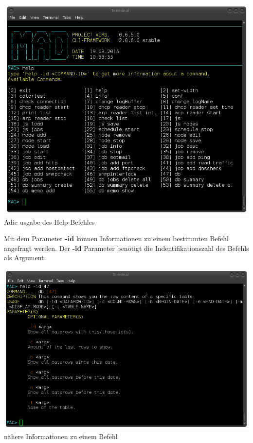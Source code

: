 \documentclass[12pt,a4paper]{report}
\begin{document}
\begin{onehalfspace}
\begin{center}
\includegraphics[scale=0.5]{img/cli_help.png}\\
Adie usgabe des Help-Befehles
\end{center}

Mit dem Parameter \textbf{-id} können Informationen zu einem bestimmten Befehl angefragt werden. Der \textbf{-id} Parameter benötigt die Indentifikationszahl des Befehls als Argument.

\begin{center}
\includegraphics[scale=0.5]{img/cli_help_id.png}\\
nähere Informationen zu einem Befehl
\end{center}


\end{onehalfspace}
\end{document}
